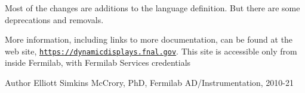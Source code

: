 Most of the changes are additions to the language definition. But there are some deprecations and removals. 

More information, including links to more documentation, can be found at the web site, \href{https://dynamicdisplays.fnal.gov}{\tt https\-://dynamicdisplays.\-fnal.\-gov}. This site is accessible only from inside Fermilab, with Fermilab Services credentials 

\begin{DoxyAuthor}{Author}
Elliott Simkins Mc\-Crory, Ph\-D, Fermilab A\-D/\-Instrumentation, 2010-\/21 
\end{DoxyAuthor}

